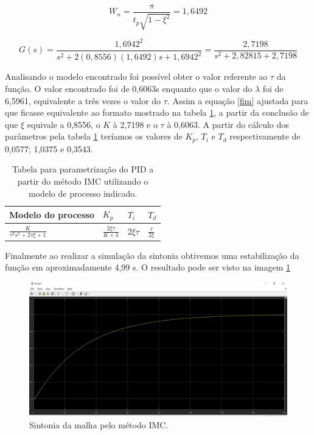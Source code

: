 \documentclass[article,12pt,oneside,a4paper,english,brazil,sumario=tradicional]{abntex2}
\begin{document}
\begin{equation}
    W_{n}=\frac{\pi}{t_{p}\sqrt{1-\xi^{2}}}=1,6492
    \label{wn}
\end{equation}

\begin{equation}
G(s)=\frac{1,6942^{2}}{s^{2}+2(0,8556)(1,6492)s+ 1,6942^{2}}=\frac{2,7198}{s^{2}+2,82815+ 2,7198}
    \label{fim}
\end{equation}
   
Analisando o modelo encontrado  foi possível obter o valor referente ao $\tau$ da função. O valor encontrado foi de 0,6063s enquanto que o valor do $\lambda$ foi de 6,5961, equivalente a três vezes o valor do $\tau$. Assim a equação \ref{fim} ajustada para que ficasse equivalente ao formato mostrado na tabela \ref{imc}, a partir da conclusão de que $\xi$ equivale a 0,8556, o $K$ à 2,7198 e o $\tau$ à 0,6063. A partir do cálculo dos parâmetros pela tabela \ref{imc} teríamos os valores de $K_p$, $T_i$ e $T_d$ respectivamente de 0,0577;  1,0375 e 0,3543. 


\begin{table}[H]
\centering
\caption{ Tabela para parametrização do PID a partir do método IMC utilizando o modelo de processo indicado.}
\begin{tabular}{|l|l|l|l|}
\hline
Modelo do processo  & $K_p$ & $T_i$ & $T_d$ \\\hline
$\frac{K}{\tau^{2}s^{2}+2\tau \xi + 1} $& $\frac{2\xi \tau}{K \times \lambda}$  & $2\xi\tau$ &  $\frac{\tau}{2\xi}$ \\\hline

\end{tabular}

\label{imc}
\end{table}

Finalmente ao realizar a simulação da sintonia obtivemos uma estabilização da função em aproximadamente 4,99 s. O resultado pode ser visto na imagem \ref{imcfig}

\begin{figure}[H]
    \centering
    \includegraphics[scale=0.255]{imc.jpg}
    \caption{Sintonia da malha pelo método IMC.}
    \label{imcfig}
\end{figure}
\end{document}
